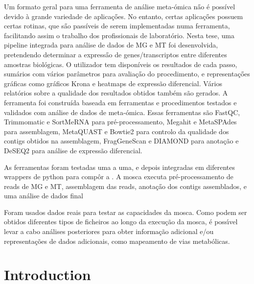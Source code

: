 \documentclass[
  oneside,
  11pt, a4paper,
  footinclude=true,
  headinclude=true,
  cleardoublepage=empty
]{scrbook}
\begin{document}
	Um formato geral para uma ferramenta de an\'{a}lise meta-\'{o}mica n\H{a}o \'{e} poss\'{i}vel devido \`{a} grande variedade de aplica\c{c}\H{o}es. No entanto, certas aplica\c{c}\H{o}es possuem certas rotinas, que s\H{a}o pass\'{i}veis de serem implementadas numa ferramenta, facilitando assim o trabalho dos profissionais de laborat\'{o}rio. Nesta tese, uma pipeline integrada para an\'{a}lise de dados de MG e MT foi desenvolvida, pretendendo determinar a express\H{a}o de genes/transcriptos entre diferentes amostras biol\'{o}gicas. O utilizador tem dispon\'{i}veis os resultados de cada passo, sum\'{a}rios com v\'{a}rios par\^{a}metros para avalia\c{c}\H{a}o do procedimento, e representa\c{c}\H{o}es gr\'{a}ficas como gr\'{a}ficos Krona e heatmaps de express\~{a}o diferencial. V\'{a}rios relat\'{o}rios sobre a qualidade dos resultados obtidos tamb\'{e}m s\~{a}o gerados. A ferramenta foi constru\'{i}da baseada em ferramentas e procedimentos testados e validados com an\'{a}lise de dados de meta-\'{o}mica. Essas ferramentas s\~{a}o FastQC, Trimmomatic e SortMeRNA para pr\'{e}-processamento, Megahit e MetaSPAdes para assemblagem, MetaQUAST e Bowtie2 para controlo da qualidade dos contigs obtidos na assemblagem, FragGeneScan e DIAMOND para anota\c{c}\~{a}o e DeSEQ2 para an\'{a}lise de express\~{a}o diferencial.
	
	As ferramentas foram testadas uma a uma, e depois integradas em diferentes wrappers de python para comp\^{o}r a . A \gls{mosca} executa pr\'{e}-processamento de reads de MG e MT, assemblagem das reads, anota\c{c}\H{a}o dos contigs assemblados, e uma an\'{a}lise de dados final
	
	Foram usados dados reais para testar as capacidades da \gls{mosca}. Como podem ser obtidos diferentes tipos de ficheiros ao longo da execu\c{c}\~{a}o da \gls{mosca}, \'{e} poss\'{\i}vel levar a cabo an\'{a}lises posteriores para obter informa\c{c}\~{a}o adicional e/ou representa\c{c}\~{o}es de dados adicionais, como mapeamento de vias metab\'{o}licas.

	
	\tableofcontents
	\listoffigures
	\listoftables
	\printglossary[type=\acronymtype]
	\printglossaries
	\clearpage
	\thispagestyle{empty}
	
	\chapter{Introduction}
	
\end{document}
